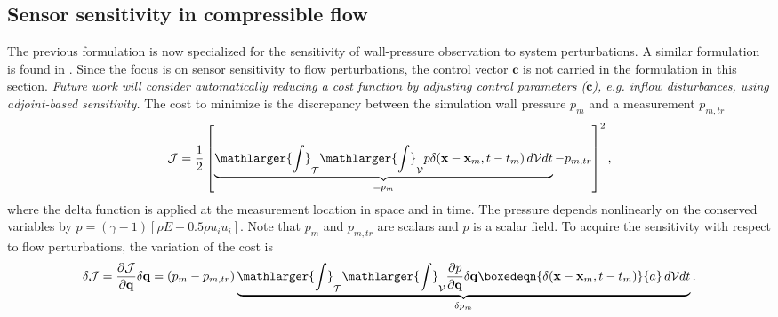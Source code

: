 \subsection{Sensor sensitivity in compressible flow}
The previous formulation is now specialized for the sensitivity of wall-pressure observation to system perturbations. A similar formulation is found in \cite{wang2019spatial}. Since the focus is on sensor sensitivity to flow perturbations, the control vector $\mathbf{c}$ is not carried in the formulation in this section. \textit{Future work will consider automatically reducing a cost function by adjusting control parameters ($\mathbf{c}$), e.g. inflow disturbances, using adjoint-based sensitivity.} The cost to minimize is the discrepancy between the simulation wall pressure $p_m$ and a measurement $p_{m,tr}$
\begin{equation}\label{eq:costp}
\mathcal{J} = \frac{1}{2} \left[\underbrace{\mathlarger{\int}_{\mathcal{T}}\mathlarger{\int}_{\mathcal{V}} p \delta(\mathbf{x}-\mathbf{x}_m,t-t_m)\,d\mathcal{V} dt}_{=p_m} - p_{m,tr}\right]^2,
\end{equation}
where the delta function is applied at the measurement location in space and in time.  The pressure depends nonlinearly on the conserved variables by $p=(\gamma-1)\left[\rho E - 0.5 \rho u_i u_i \right]$.  Note that $p_m$ and $p_{m,tr}$ are scalars and $p$ is a scalar field. %
%
To acquire the sensitivity with respect to flow perturbations, the variation of the cost is
%
\begin{equation}\label{eq:varCostP}
\delta \mathcal{J}= \frac{\partial \mathcal{J}}{\partial \mathbf{q}} \delta \mathbf{q}= {(p_m-p_{m,tr})}\underbrace{\mathlarger{\int}_{\mathcal{T}} \mathlarger{\int}_{\mathcal{V}} \frac{\partial p}{\partial \mathbf{q}}\delta{\mathbf{q}} \boxedeqn{\delta(\mathbf{x}-\mathbf{x}_m,t-t_m)}{a}\,d\mathcal{V} dt}_{\delta p_m}.
\end{equation}
